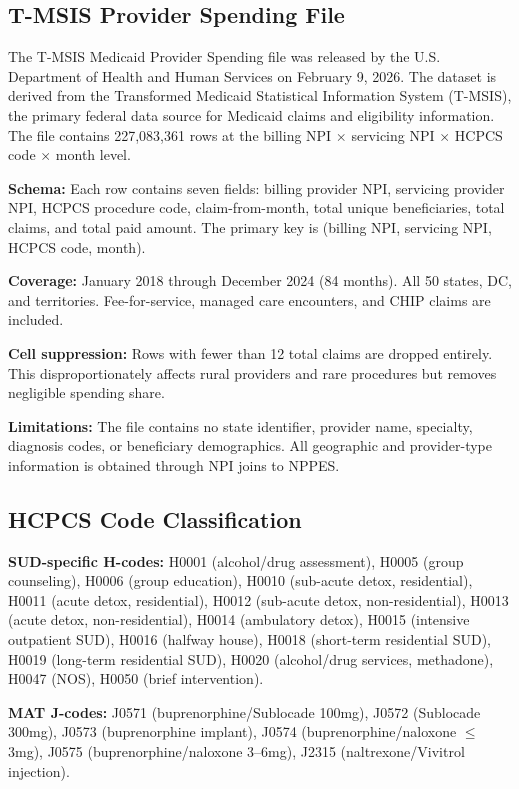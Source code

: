 \documentclass[12pt]{article}
\begin{document}
\subsection{T-MSIS Provider Spending File}

The T-MSIS Medicaid Provider Spending file was released by the U.S. Department of Health and Human Services on February 9, 2026. The dataset is derived from the Transformed Medicaid Statistical Information System (T-MSIS), the primary federal data source for Medicaid claims and eligibility information. The file contains 227,083,361 rows at the billing NPI $\times$ servicing NPI $\times$ HCPCS code $\times$ month level.

\textbf{Schema:} Each row contains seven fields: billing provider NPI, servicing provider NPI, HCPCS procedure code, claim-from-month, total unique beneficiaries, total claims, and total paid amount. The primary key is (billing NPI, servicing NPI, HCPCS code, month).

\textbf{Coverage:} January 2018 through December 2024 (84 months). All 50 states, DC, and territories. Fee-for-service, managed care encounters, and CHIP claims are included.

\textbf{Cell suppression:} Rows with fewer than 12 total claims are dropped entirely. This disproportionately affects rural providers and rare procedures but removes negligible spending share.

\textbf{Limitations:} The file contains no state identifier, provider name, specialty, diagnosis codes, or beneficiary demographics. All geographic and provider-type information is obtained through NPI joins to NPPES.

\subsection{HCPCS Code Classification}

\textbf{SUD-specific H-codes:} H0001 (alcohol/drug assessment), H0005 (group counseling), H0006 (group education), H0010 (sub-acute detox, residential), H0011 (acute detox, residential), H0012 (sub-acute detox, non-residential), H0013 (acute detox, non-residential), H0014 (ambulatory detox), H0015 (intensive outpatient SUD), H0016 (halfway house), H0018 (short-term residential SUD), H0019 (long-term residential SUD), H0020 (alcohol/drug services, methadone), H0047 (NOS), H0050 (brief intervention).

\textbf{MAT J-codes:} J0571 (buprenorphine/Sublocade 100mg), J0572 (Sublocade 300mg), J0573 (buprenorphine implant), J0574 (buprenorphine/naloxone $\leq$3mg), J0575 (buprenorphine/naloxone 3--6mg), J2315 (naltrexone/Vivitrol injection).
\end{document}
